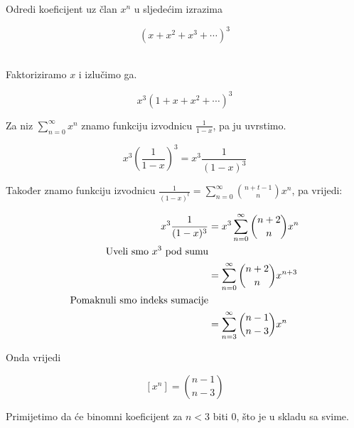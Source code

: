 \documentclass[exam.tex]{subfiles}
\begin{document}
	\begin{subtask}
		Odredi koeficijent uz član \( x^n \) u sljedećim izrazima
	
		\[ (x + x^2 + x^3 + \cdots)^3 \] \\
	\end{subtask}
	
	Faktoriziramo \( x \) i izlučimo ga.
	
	\[ x^3 (1 + x + x^2 + \cdots)^3 \]
	
	Za niz \( \sum\limits^\infty_{n=0} x^n \) znamo funkciju izvodnicu \( \frac{1}{1 - x} \), pa ju uvrstimo.
	
	\[ x^3 \left ( \frac{1}{1 - x} \right )^3 = x^3 \frac{1}{(1 - x)^3} \]
	
	Također znamo funkciju izvodnicu \( \frac{1}{(1 - x)^t} = \sum\limits^\infty_{n=0} \binom{n + t - 1}{n} x^n \), pa vrijedi:
	
	\begin{align*}
		x^3 \frac{1}{(1 - x)^3} &= x^3 \sum\limits^\infty_{n=0} \binom{n + 2}{n} x^n \\
		\text{Uveli smo \( x^3 \) pod sumu} \\
		&= \sum\limits^\infty_{n=0} \binom{n + 2}{n} x^{n + 3} \\
		\text{Pomaknuli smo indeks sumacije} \\
		&= \sum\limits^\infty_{n=3} \binom{n - 1}{n - 3} x^n
	\end{align*}
	
	Onda vrijedi
	
	\[ [x^n] = \binom{n - 1}{n - 3} \]
	
	Primijetimo da će binomni koeficijent za \( n < 3 \) biti 0, što je u skladu sa svime.
\end{document}
